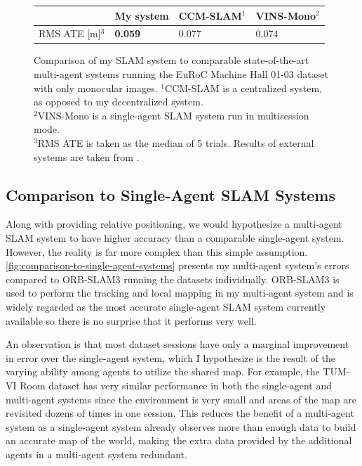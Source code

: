 \begin{figure}[h]
    \centering
    \def\arraystretch{1.2}
    \begin{tabular}{ |l|l|l|l| }
        \cline{2-4}
        \multicolumn{1}{c|}{} & My system      & CCM-SLAM$^1$ & VINS-Mono$^2$ \\
        \hline
        RMS ATE [m]$^3$       & \textbf{0.059} & 0.077        & 0.074         \\
        \hline
    \end{tabular}

    \caption{Comparison of my SLAM system to comparable state-of-the-art multi-agent systems running the EuRoC Machine Hall 01-03 dataset with only monocular images. \captionbreak $^1$CCM-SLAM is a centralized system, as opposed to my decentralized system. \\ $^2$VINS-Mono is a single-agent SLAM system run in multisession mode. \\ $^3$RMS ATE is taken as the median of 5 trials. Results of external systems are taken from \autocite{schmuck2019ccm}.}
    \label{fig:comparison-to-multi-agent-systems}
\end{figure}

\subsection{Comparison to Single-Agent SLAM Systems}
Along with providing relative positioning, we would hypothesize a multi-agent SLAM system to have higher accuracy than a comparable single-agent system. However, the reality is far more complex than this simple assumption. \autoref{fig:comparison-to-single-agent-systems} presents my multi-agent system's errors compared to ORB-SLAM3 running the datasets individually. ORB-SLAM3 is used to perform the tracking and local mapping in my multi-agent system and is widely regarded as the most accurate single-agent SLAM system currently available so there is no surprise that it performs very well.

An observation is that most dataset sessions have only a marginal improvement in error over the single-agent system, which I hypothesize is the result of the varying ability among agents to utilize the shared map. For example, the TUM-VI Room dataset has very similar performance in both the single-agent and multi-agent systems since the environment is very small and areas of the map are revisited dozens of times in one session. This reduces the benefit of a multi-agent system as a single-agent system already observes more than enough data to build an accurate map of the world, making the extra data provided by the additional agents in a multi-agent system redundant.


